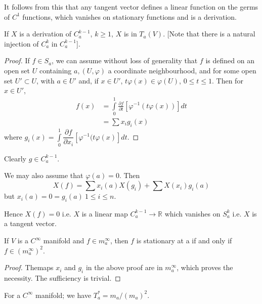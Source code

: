 It follows from this that any tangent vector defines a linear function
on the germs of $C^1$ functions, which vanishes on stationary
functions and is a derivation. 

\begin{proposition}\label{chap2:sec1:prop3} %
  If $X$ is a derivation of $C^{k - 1}_a$, $k \ge 1$, $X$ is in $T_a
  (V)$. [Note that there is a natural injection of $C^k_a $ in
    $C^{k-1}_a$]. 
\end{proposition}

\begin{proof}
  If $f \in S_a$, we can assume without loss of generality that $f$ is
  defined on an open set $U$ containing $a, (U, \varphi)$ a coordinate
  neighbourhood, and for some open set $U' \subset U$, with $a  \in
  U'$ and, if $x \in U'$, $t \varphi (x) \in \varphi (U)$, $0 \le t \le
  1$. Then for $x \in U'$, 
  \begin{align*}
    f(x) & = \int\limits_{0}^1 \frac{\partial f}{\partial t} [
      \varphi^{-1} (t \varphi (x)) ] dt\\ 
    & = \sum x_i g_i (x)
  \end{align*}
  where $g_i (x) = \int\limits_{0}^1 \dfrac{\partial f}{\partial x_i}
  [\varphi^{-1} (t \varphi (x)] dt$. 
\end{proof}

Clearly $g \in C^{k-1}_a$.

We may also assume that $\varphi (a) = 0$. Then
$$
X(f) = \sum x_i (a) X (g_i) + \sum X(x_i) g_i (a)
$$
but $x_i (a) = 0= g_i (a)~ 1 \le i \le n$.

Hence $X(f) = 0$ i.e. $X$ is a linear map $C^{k-1}_a \to \mathbb{R}$
which vanishes on $S^k_a $ i.e. $X$ is a tangent vector. 

\setcounter{corollary}{0}
\begin{corollary}\label{chap2:sec1:coro1}%
  If $V$ is a $C^\infty$ manifold and $f \in m^\infty_a$, then $f$ is
  stationary at a if and only if $f \in (m^\infty_a)^2$. 
\end{corollary}

\begin{proof}
  The\pageoriginale maps $x_i$ and $g_i$ in the above proof are in $m^\infty_a$,
  which proves the necessity. The sufficiency is trivial. 
\end{proof}

\begin{corollary}\label{chap2:sec1:coro2} %
  For a $C^\infty$ manifold; we have $T^*_a = m_a /(m_a)^2$.
\end{corollary}


